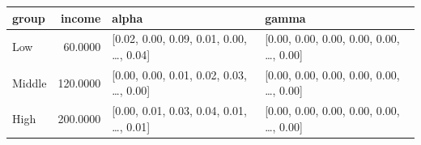 \begin{tabular}{lrll}
\toprule
group & income & alpha & gamma \\
\midrule
Low & 60.0000 & [0.02, 0.00, 0.09, 0.01, 0.00, …, 0.04] & [0.00, 0.00, 0.00, 0.00, 0.00, …, 0.00] \\
Middle & 120.0000 & [0.00, 0.00, 0.01, 0.02, 0.03, …, 0.00] & [0.00, 0.00, 0.00, 0.00, 0.00, …, 0.00] \\
High & 200.0000 & [0.00, 0.01, 0.03, 0.04, 0.01, …, 0.01] & [0.00, 0.00, 0.00, 0.00, 0.00, …, 0.00] \\
\bottomrule
\end{tabular}

